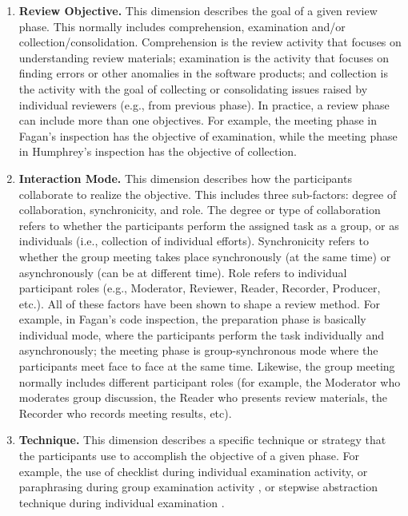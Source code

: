 \begin{enumerate}
\item {\bf Review Objective.} This dimension describes the goal
of a given review phase. This normally includes comprehension,
examination and/or collection/consolidation. Comprehension is the
review activity that focuses on understanding review materials;
examination is the activity that focuses on finding errors or other
anomalies in the software products; and collection is the activity
with the goal of collecting or consolidating issues
raised by individual reviewers (e.g., from previous phase). 
In practice, a review phase can include more than one objectives. 
For example, the meeting phase in Fagan's
inspection \cite{Fagan76} has the objective of examination, while the
meeting phase in Humphrey's inspection \cite{Humphrey90} has the
objective of collection. 

\item {\bf Interaction Mode.} This dimension describes how the
participants collaborate to realize the objective. This includes three
sub-factors: degree of collaboration, synchronicity, and role. The
degree or type of collaboration refers to whether the participants
perform the 
assigned task as a group, or as  individuals (i.e., collection of
individual efforts).  
Synchronicity refers to whether the group meeting takes place
synchronously (at the same time) or asynchronously (can be at
different time). Role refers to 
individual participant roles (e.g., Moderator, Reviewer, Reader,
Recorder, Producer, etc.). 
All of these factors have been shown to shape a review method.
For example, in Fagan's code inspection, the preparation phase is
basically individual mode, where the participants perform the task
individually and asynchronously; the meeting phase is
group-synchronous mode where the participants meet face to face at the
same time.
Likewise, the group meeting normally includes different participant
roles (for example, the Moderator who moderates group discussion, the
Reader who presents 
review materials, the Recorder who records meeting results, etc).


\item {\bf Technique.}
This dimension describes a specific technique or strategy that the
participants use to accomplish the objective of a given phase.
For example, the use of checklist during individual examination
activity, or paraphrasing during group examination activity
\cite{Fagan76}, or stepwise abstraction technique during individual
examination \cite{Basili85}.

\end{enumerate}

